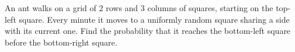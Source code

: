 An ant walks on a grid of $2$ rows and $3$ columns of squares, starting on the top-left square. Every minute it moves to a uniformly random square sharing a side with its current one. Find the probability that it reaches the bottom-left square before the bottom-right square.
